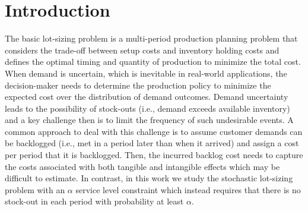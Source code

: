 \documentclass[msom]{oo}
\begin{document}
\section{Introduction}
\begin{comment}
{\cred
Contents of this section:

\begin{itemize}
    \item lot-sizing problem 
    \item Stochastic lot-sizing problem with service levels
    \item Motivation on substitution
    \item Industrial relevance
    \item Motivation of stochastic lot-sizing + random demand +joint service level + substitution 
    \item Industrial relevance
    \item Contributions of the work
\end{itemize}
}
\end{comment}
The basic lot-sizing problem is a multi-period production planning problem that considers the trade-off between setup costs and inventory holding costs and defines the optimal timing and quantity of production to minimize the total cost. 
When demand is uncertain, which is inevitable in real-world applications, the decision-maker needs to determine the production policy to minimize the expected cost over the distribution of demand outcomes. Demand uncertainty leads to the possibility of stock-outs (i.e., demand exceeds available inventory) and a key challenge then is to limit the frequency of such undesirable events. A common approach to deal with this challenge is to assume customer demands can be backlogged (i.e., met in a period later than when it arrived) and assign a cost per period that it is backlogged. Then, the incurred backlog cost needs to capture the costs associated with both tangible and intangible effects which may be difficult to estimate. 
In contrast, in this work we study the stochastic lot-sizing problem with an $\alpha$ service level constraint which instead requires that there is no stock-out in each period with probability at least $\alpha$. %
\end{document}
